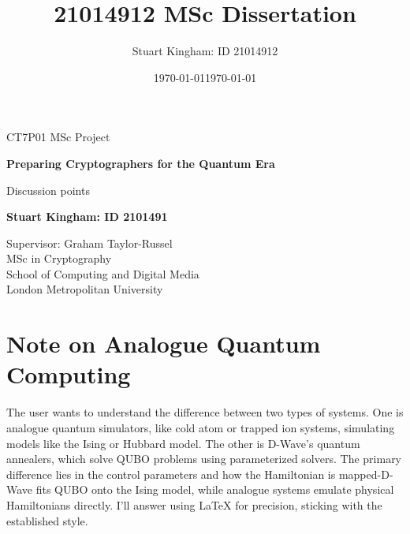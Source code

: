 \documentclass[11pt,a4paper]{article}
\author{Stuart Kingham: ID 21014912}
\title{21014912 MSc Dissertation}
\date{\today}
\begin{document}
	\doublespacing
	
	\begin{titlepage}
		\vspace*{\fill}
		\begin{center}
			\vspace*{1cm}
			
			{\LARGE CT7P01 MSc Project}
			
			
			\vspace*{1cm}
			{\large \textbf{Preparing Cryptographers for the Quantum Era}}
			
			\vspace{0.2cm}
			{\large Discussion points}
			
			
			\vfill
			
			\textbf{Stuart Kingham: ID 2101491}
			
			\vfill
			
			\vspace{0.8cm}
			
			
			Supervisor: Graham Taylor-Russel \\
			MSc in Cryptography \\
			School of Computing and Digital Media\\
			London Metropolitan University\\
			\date{\today}
			
		\end{center}
		\vspace*{\fill}
	\end{titlepage}
	
	\pagebreak
	
	
	\newpage
	
	\singlespacing 
	\tableofcontents
	\listoffigures
	\newpage
	
	\doublespacing

\section{Note on Analogue Quantum Computing}

The user wants to understand the difference between two types of systems. One is analogue quantum simulators, like cold atom or trapped ion systems, simulating models like the Ising or Hubbard model. The other is D-Wave's quantum annealers, which solve QUBO problems using parameterized solvers. The primary difference lies in the control parameters and how the Hamiltonian is mapped-D-Wave fits QUBO onto the Ising model, while analogue systems emulate physical Hamiltonians directly. I'll answer using LaTeX for precision, sticking with the established style.
\end{document}
